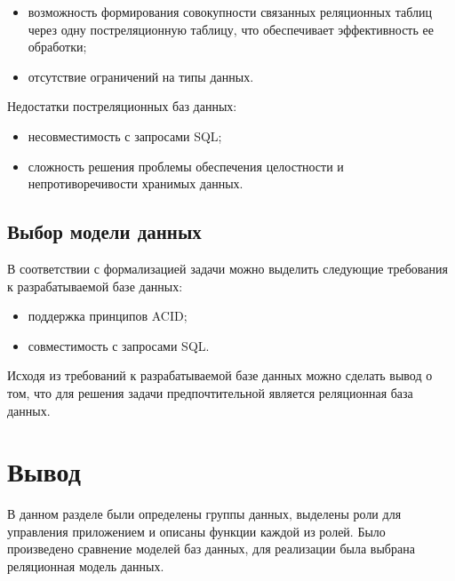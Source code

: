 \begin{itemize}
	\item возможность формирования совокупности связанных реляционных таблиц через одну постреляционную таблицу, что обеспечивает эффективность ее обработки;
	\item отсутствие ограничений на типы данных.
\end{itemize}

Недостатки постреляционных баз данных:

\begin{itemize}
	\item несовместимость с запросами SQL;
	\item сложность решения проблемы обеспечения целостности и непротиворечивости хранимых данных.
\end{itemize}

\subsection{Выбор модели данных}

В соответствии с формализацией задачи можно выделить следующие требования к разрабатываемой базе данных:

\begin{itemize}
	\item поддержка принципов ACID;
	\item совместимость с запросами SQL.
\end{itemize}

Исходя из требований к разрабатываемой базе данных можно сделать вывод о том, что для решения задачи предпочтительной является реляционная база данных.

\section*{Вывод}
В данном разделе были определены группы данных, выделены роли для управления приложением и описаны функции каждой из ролей. Было произведено сравнение моделей баз данных, для реализации была выбрана реляционная модель данных.
